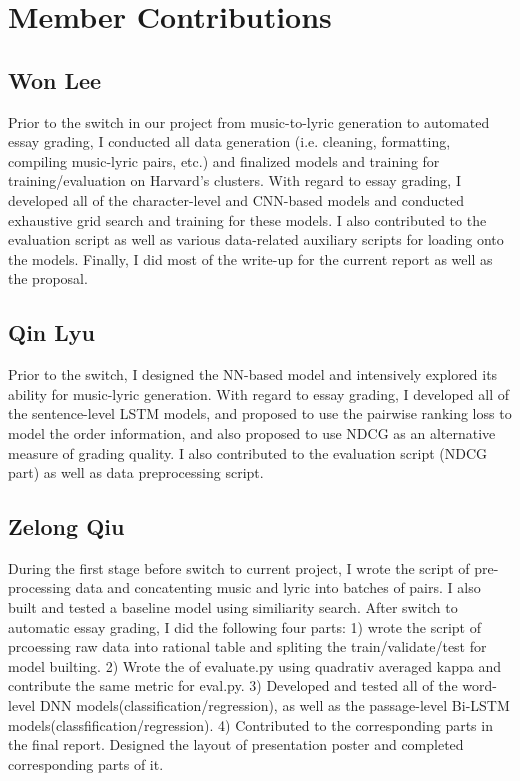 \documentclass[10pt,psamsfonts]{amsart}
\theoremstyle{definition}
\theoremstyle{remark}
\numberwithin{equation}{section}
\begin{document}
\section*{Member Contributions}

\subsection*{Won Lee}

Prior to the switch in our project from music-to-lyric generation to automated essay grading, I conducted all data generation (i.e. cleaning, formatting, compiling music-lyric pairs, etc.) and finalized models and training for training/evaluation on Harvard's clusters. With regard to essay grading, I developed all of the character-level and CNN-based models and conducted exhaustive grid search and training for these models. I also contributed to the evaluation script as well as various data-related auxiliary scripts for loading onto the models. Finally, I did most of the write-up for the current report as well as the proposal.

\subsection*{Qin Lyu}

Prior to the switch, I designed the NN-based model and intensively explored its ability for music-lyric generation. With regard to essay grading, I developed all of the sentence-level LSTM models, and proposed to use the pairwise ranking loss to model the order information, and also proposed to use NDCG as an alternative measure of grading quality. I also contributed to the evaluation script (NDCG part) as well as data preprocessing script.

\subsection*{Zelong Qiu}
During the first stage before switch to current project, I wrote the script of pre-processing data and concatenting music and lyric into batches of pairs. I also built and tested a baseline model using similiarity search. After switch to automatic essay grading, I did the following four parts: 1) wrote the script of prcoessing raw data into rational table and spliting the train/validate/test for model builting. 2) Wrote the of evaluate.py using quadrativ averaged kappa and contribute the same metric for eval.py. 3) Developed and tested all of the word-level DNN models(classification/regression), as well as the passage-level Bi-LSTM models(classfification/regression). 4) Contributed to the corresponding parts in the final report. Designed the layout of presentation poster and completed corresponding parts of it.
\end{document}
